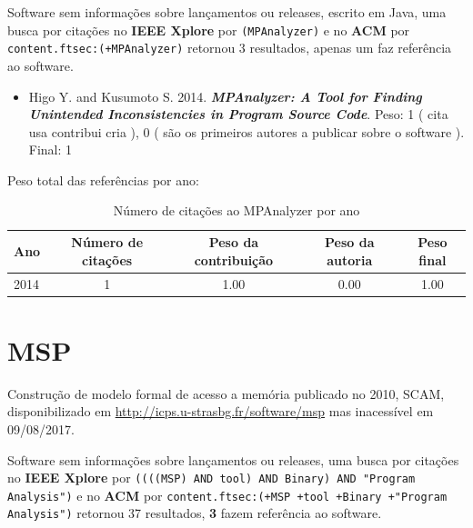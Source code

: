 Software sem informações sobre lançamentos ou releases,
escrito em Java,
uma busca por citações no {\bf IEEE Xplore} por
\texttt{(MPAnalyzer)}
e no {\bf ACM} por
\texttt{content.ftsec:(+MPAnalyzer)}
retornou
3 resultados,
apenas um faz referência ao software.

\begin{itemize}
\item Higo Y. and Kusumoto S.
      2014.
        \textbf{\textit{ MPAnalyzer: A Tool for Finding Unintended Inconsistencies in Program Source Code}}.
      Peso:
      1 (
          cita
          usa
          contribui
          cria
      ),
      0 (
são os primeiros autores a publicar sobre o software
      ).
      Final:
      1

\end{itemize}

Peso total das referências por ano:

\begin{table}[h]
\caption{Número de citações ao MPAnalyzer por ano}
\centering
\begin{tabular}{| l | c | c | c | c |}
  \hline
  Ano & Número de citações & Peso da contribuição & Peso da autoria & Peso final \\
  \hline
  2014
    & 1
    & 1.00
    & 0.00
    & 1.00 \\
  \hline
\end{tabular}
\end{table}


\section{MSP}

Construção de modelo formal de acesso a memória
publicado no 2010, SCAM,
disponibilizado em \url{http://icps.u-strasbg.fr/software/msp}
mas inacessível em 09/08/2017.

Software sem informações sobre lançamentos ou releases,
uma busca por citações no {\bf IEEE Xplore} por
\texttt{((((MSP) AND tool) AND Binary) AND "Program Analysis")}
e no {\bf ACM} por
\texttt{content.ftsec:(+MSP +tool +Binary +"Program Analysis")}
retornou
37 resultados,
{\bf 3} fazem referência ao software.

